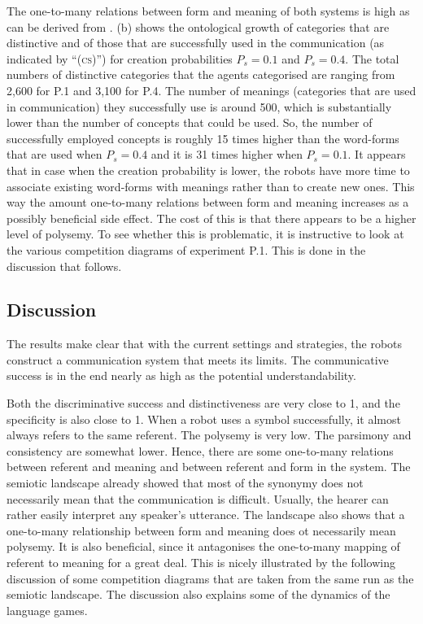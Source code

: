 The one-to-many relations between form and meaning of both systems is high as can be derived from .  (b) shows the ontological growth of categories that are distinctive and of those that are successfully used in the communication (as indicated by  ``\textsc{(cs)}'') for creation probabilities $P_s=0.1$ and $P_s=0.4$. The total numbers of distinctive categories that the agents categorised are ranging from 2,600 for P.1 and 3,100 for P.4. The number of meanings (categories that are used in communication) they successfully use is around 500, which is substantially lower than the number of concepts that could be used. So, the number of successfully employed concepts is roughly 15 times higher than the word-forms that are used when $P_s=0.4$ and it is 31 times higher when $P_s=0.1$. It appears that in case when the creation probability is lower, the robots have more time to associate existing word-forms with meanings rather than to create new ones. This way the amount one-to-many relations between form and meaning increases as a possibly beneficial side effect. The cost of this is that there appears to be a higher level of polysemy. To see whether this is problematic, it is instructive to look at the various competition diagrams of experiment P.1. This is done in the discussion that follows.

\subsection{Discussion}

The results make clear that with the current settings and strategies, the robots construct a communication system that meets its limits. The communicative success is in the end nearly as high as the potential understandability. 

Both the discriminative success and distinctiveness are very close to 1, and the specificity is also close to 1. When a robot uses a symbol successfully, it almost always refers to the same referent. The polysemy is very low. The parsimony and consistency are somewhat lower. Hence, there are some one-to-many relations between referent and meaning and between referent and form in the system. The semiotic landscape already showed that most of the synonymy does not necessarily mean that the communication is difficult. Usually, the hearer can rather easily interpret any speaker's utterance. The landscape also shows that a one-to-many relationship between form and meaning does ot necessarily mean polysemy. It is also beneficial, since it antagonises the one-to-many mapping of referent to meaning for a great deal. This is nicely illustrated by the following discussion of some competition diagrams that are taken from the same run as the semiotic landscape. The discussion also explains some of the dynamics of the language games.


